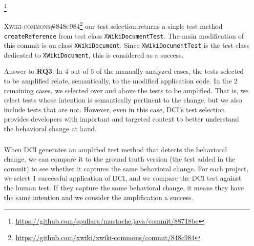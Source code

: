 \footnote{\url{https://github.com/spullara/mustache.java/commit/88718bc}}

\textsc{Xwiki-commons\#848c984}\footnote{\url{https://github.com/xwiki/xwiki-commons/commit/848c984}} our test selection returns a single test method \texttt{createReference} from test class \texttt{XWikiDocumentTest}.
The main modification of this commit is on class \texttt{XWikiDocument}.
Since \texttt{XWikiDocumentTest} is the test class dedicated to \texttt{XWikiDocument}, this is considered as a success.

\begin{mdframed}
Answer to \textbf{RQ3}: 
In 4 out of 6 of the manually analyzed cases, the tests selected to be amplified relate, semantically, to the modified application code. 
In the 2 remaining cases, we selected over and above the tests to be amplified.
That is, we select tests whose intention is semantically pertinent to the change, but we also include tests that are not.
However, even in this case, DCI's test selection provides developers with important and targeted context to better understand the behavioral change at hand.
\end{mdframed}


\subsubsection{\rqhuman}
\label{subsubsec:answerq4}

When DCI generates an amplified test method that detects the behavioral change, we can compare it to the ground truth version (the test added in the commit) to see whether it captures the same behavioral change.
For each project, we select 1 successful application of DCI, and we compare the DCI test against the human test.
If they capture the same behavioral change, it means they have the same intention and we consider the amplification a success.

